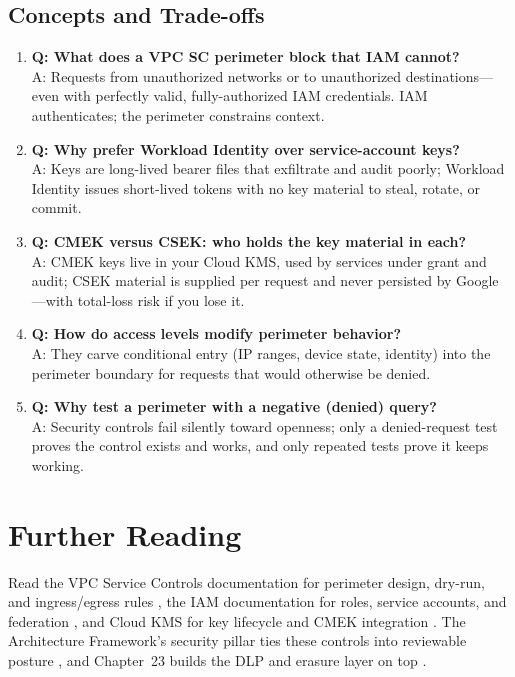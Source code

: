 \subsection{Concepts and Trade-offs}
\begin{enumerate}
    \item \textbf{Q: What does a VPC SC perimeter block that IAM cannot?}\\
    A: Requests from unauthorized networks or to unauthorized destinations---even with perfectly valid, fully-authorized IAM credentials. IAM authenticates; the perimeter constrains context.

    \item \textbf{Q: Why prefer Workload Identity over service-account keys?}\\
    A: Keys are long-lived bearer files that exfiltrate and audit poorly; Workload Identity issues short-lived tokens with no key material to steal, rotate, or commit.

    \item \textbf{Q: CMEK versus CSEK: who holds the key material in each?}\\
    A: CMEK keys live in your Cloud KMS, used by services under grant and audit; CSEK material is supplied per request and never persisted by Google---with total-loss risk if you lose it.

    \item \textbf{Q: How do access levels modify perimeter behavior?}\\
    A: They carve conditional entry (IP ranges, device state, identity) into the perimeter boundary for requests that would otherwise be denied.

    \item \textbf{Q: Why test a perimeter with a negative (denied) query?}\\
    A: Security controls fail silently toward openness; only a denied-request test proves the control exists and works, and only repeated tests prove it keeps working.
\end{enumerate}

\section{Further Reading}
Read the VPC Service Controls documentation for perimeter design, dry-run, and ingress/egress rules \cite{googlecloudvpcscdocs}, the IAM documentation for roles, service accounts, and federation \cite{googlecloudiamoverview}, and Cloud KMS for key lifecycle and CMEK integration \cite{googlecloudkmsdocs}. The Architecture Framework's security pillar ties these controls into reviewable posture \cite{googlecloudarchitectureframework}, and Chapter~23 builds the DLP and erasure layer on top \cite{googleclouddlpdocs}.

